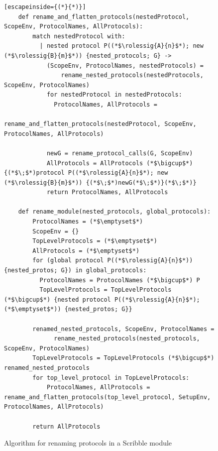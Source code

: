 \documentclass[12pt,twoside]{report}
\begin{document}
\begin{figure}[h!]
    \centering
    \lstset{language=Pseudocode}
    \begin{lstlisting}[escapeinside={(*}{*)}]
    def rename_and_flatten_protocols(nestedProtocol, ScopeEnv, ProtocolNames, AllProtocols):
        match nestedProtocol with:
          | nested protocol P((*$\rolessig{A}{n}$*); new (*$\rolessig{B}{m}$*)) {nested_protocols; G} ->
            (ScopeEnv, ProtocolNames, nestedProtocols) = 
                rename_nested_protocols(nestedProtocols, ScopeEnv, ProtocolNames)
            for nestedProtocol in nestedProtocols:
              ProtocolNames, AllProtocols = 
                  rename_and_flatten_protocols(nestedProtocol, ScopeEnv, ProtocolNames, AllProtocols)

            newG = rename_protocol_calls(G, ScopeEnv)
            AllProtocols = AllProtocols (*$\bigcup$*) {(*$\;$*)protocol P((*$\rolessig{A}{n}$*); new (*$\rolessig{B}{m}$*)) {(*$\;$*)newG(*$\;$*)}(*$\;$*)}
            return ProtocolNames, AllProtocols
      
    def rename_module(nested_protocols, global_protocols):
        ProtocolNames = (*$\emptyset$*)
        ScopeEnv = {}
        TopLevelProtocols = (*$\emptyset$*)
        AllProtocols = (*$\emptyset$*)
        for (global protocol P((*$\rolessig{A}{n}$*)) {nested_protos; G}) in global_protocols:
          ProtocolNames = ProtocolNames (*$\bigcup$*) P
          TopLevelProtocols = TopLevelProtocols (*$\bigcup$*) {nested protocol P((*$\rolessig{A}{n}$*); (*$\emptyset$*)) {nested_protos; G}}

        renamed_nested_protocols, ScopeEnv, ProtocolNames = 
              rename_nested_protocols(nested_protocols, ScopeEnv, ProtocolNames)
        TopLevelProtocols = TopLevelProtocols (*$\bigcup$*) renamed_nested_protocols
        for top_level_protocol in TopLevelProtocols:
            ProtocolNames, AllProtocols = rename_and_flatten_protocols(top_level_protocol, SetupEnv, ProtocolNames, AllProtocols)

        return AllProtocols

    \end{lstlisting}
    \caption{Algorithm for renaming protocols in a Scribble module}
    \label{renaming-module}
\end{figure}
\clearpage
\end{document}
